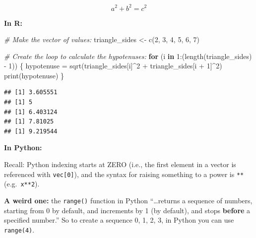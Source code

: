 \documentclass[
]{book}
\newenvironment{Shaded}{\begin{snugshade}}{\end{snugshade}}
\newcommand{\CommentTok}[1]{\textcolor[rgb]{0.56,0.35,0.01}{\textit{#1}}}
\newcommand{\ControlFlowTok}[1]{\textcolor[rgb]{0.13,0.29,0.53}{\textbf{#1}}}
\newcommand{\DecValTok}[1]{\textcolor[rgb]{0.00,0.00,0.81}{#1}}
\newcommand{\FunctionTok}[1]{\textcolor[rgb]{0.00,0.00,0.00}{#1}}
\newcommand{\NormalTok}[1]{#1}
\newcommand{\OtherTok}[1]{\textcolor[rgb]{0.56,0.35,0.01}{#1}}
\newcommand{\SpecialCharTok}[1]{\textcolor[rgb]{0.00,0.00,0.00}{#1}}
\begin{document}
\[a^2 + b^2 = c^2\]

\textbf{In R:}

\begin{Shaded}
\begin{Highlighting}[]
\CommentTok{\# Make the vector of values: }
\NormalTok{triangle\_sides }\OtherTok{\textless{}{-}} \FunctionTok{c}\NormalTok{(}\DecValTok{2}\NormalTok{, }\DecValTok{3}\NormalTok{, }\DecValTok{4}\NormalTok{, }\DecValTok{5}\NormalTok{, }\DecValTok{6}\NormalTok{, }\DecValTok{7}\NormalTok{)}

\CommentTok{\# Create the loop to calculate the hypotenuses: }
\ControlFlowTok{for}\NormalTok{ (i }\ControlFlowTok{in} \DecValTok{1}\SpecialCharTok{:}\NormalTok{(}\FunctionTok{length}\NormalTok{(triangle\_sides) }\SpecialCharTok{{-}} \DecValTok{1}\NormalTok{)) \{}
\NormalTok{  hypotenuse }\OtherTok{=} \FunctionTok{sqrt}\NormalTok{(triangle\_sides[i]}\SpecialCharTok{\^{}}\DecValTok{2} \SpecialCharTok{+}\NormalTok{ triangle\_sides[i }\SpecialCharTok{+} \DecValTok{1}\NormalTok{]}\SpecialCharTok{\^{}}\DecValTok{2}\NormalTok{)}
  \FunctionTok{print}\NormalTok{(hypotenuse)}
\NormalTok{\}}
\end{Highlighting}
\end{Shaded}

\begin{verbatim}
## [1] 3.605551
## [1] 5
## [1] 6.403124
## [1] 7.81025
## [1] 9.219544
\end{verbatim}

\textbf{In Python:}

Recall: Python indexing starts at ZERO (i.e., the first element in a vector is referenced with \texttt{vec{[}0{]}}), and the syntax for raising something to a power is \texttt{**} (e.g.~\texttt{x**2}).

\textbf{A weird one:} the \texttt{range()} function in Python ``\ldots returns a sequence of numbers, starting from 0 by default, and increments by 1 (by default), and stops \textbf{before} a specified number.'' So to create a sequence 0, 1, 2, 3, in Python you can use \texttt{range(4)}.
\end{document}
